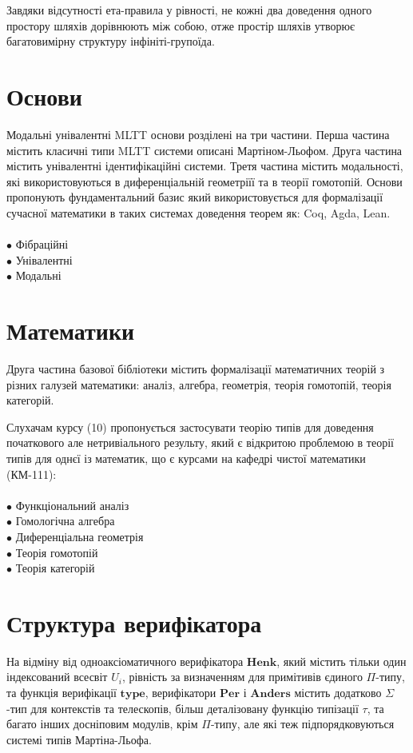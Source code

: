 \documentclass{article}
\theoremstyle{definition}
\begin{document}
Завдяки відсутності ета-правила у рівності, не кожні два
доведення одного простору шляхів дорівнюють між собою, отже
простір шляхів утворює багатовимірну структуру інфініті-групоїда.

\newpage
\section*{Основи}

Модальні унівалентні MLTT основи розділені на три частини.
Перша частина містить класичні типи MLTT системи описані
Мартіном-Льофом. Друга частина містить унівалентні ідентифікаційні
системи. Третя частина містить модальності, які використовуються
в диференціальній геометріїї та в теорії гомотопій. Основи
пропонують фундаментальний базис який використовується для
формалізації сучасної математики в таких системах доведення
теорем як: Coq, Agda, Lean.\\
\\
\noindent
$\bullet$ Фібраційні \\
$\bullet$ Унівалентні \\
$\bullet$ Модальні

\section*{Математики}

Друга частина базової бібліотеки містить формалізації математичних
теорій з різних галузей математики: аналіз, алгебра, геометрія,
теорія гомотопій, теорія категорій.

Слухачам курсу (10) пропонується застосувати теорію типів для
доведення початкового але нетривіального результу, який є
відкритою проблемою в теорії типів для однєї із математик,
що є курсами на кафедрі чистої математики (КМ-111):\\
\\
\noindent
$\bullet$ Функціональний аналіз \\
$\bullet$ Гомологічна алгебра \\
$\bullet$ Диференціальна геометрія \\
$\bullet$ Теорія гомотопій \\
$\bullet$ Теорія категорій \\

\newpage
\section*{Структура верифікатора}

На відміну від одноаксіоматичного верифікатора $\mathbf{Henk}$, який містить тільки
один індексований всесвіт $U_i$, рівність за визначенням для примітивів єдиного $\Pi$-типу,
та функція верифікації $\mathbf{type}$, верифікатори $\mathbf{Per}$ і $\mathbf{Anders}$ містить додатково
$\Sigma$-тип для контекстів та телескопів, більш деталізовану функцію типізації $\tau$,
та багато інших досніповим модулів, крім $\Pi$-типу, але які теж підпорядковуються системі типів Мартіна-Льофа.
\end{document}
